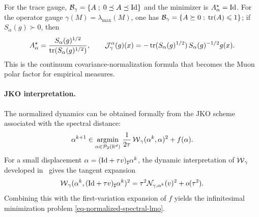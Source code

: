 For the trace gauge, $\mathcal B_\gamma=\left\{ A \;;\; 0\preceq A\preceq\mathrm{Id} \right\}$ and the minimizer is $A_\alpha^\star=\mathrm{Id}$. For the operator gauge $\gamma(M)=\lambda_{\max}(M)$, one has $\mathcal B_\gamma=\left\{ A\succeq0 \;;\; \operatorname{tr}(A)\leqslant1 \right\}$; if $S_\alpha(g)\succ0$, then
\[
	A_\alpha^\star
	=
	\frac{S_\alpha(g)^{1/2}}{\operatorname{tr}(S_\alpha(g)^{1/2})},
	\qquad
	\mathcal J_{\gamma}^{\alpha}(g)(x)
	=
	-\operatorname{tr}(S_\alpha(g)^{1/2})\,S_\alpha(g)^{-1/2}g(x).
\]
This is the continuum covariance-normalization formula that becomes the Muon polar factor for empirical measures.

\paragraph{JKO interpretation.}
The normalized dynamics can be obtained formally from the JKO scheme associated with the spectral distance:
\begin{equation}\label{eq-normalized-spectral-jko}
	\alpha^{k+1}
	\in
	\underset{\alpha\in\mathcal{P}_2(\mathbb{R}^d)}{\operatorname{argmin}}\;
	\frac{1}{2\tau}\operatorname{\mathcal{W}}_\gamma(\alpha^k,\alpha)^2+f(\alpha).
\end{equation}
For a small displacement $\alpha=(\mathrm{Id}+\tau v)_\sharp\alpha^k$, the dynamic interpretation of $\operatorname{\mathcal{W}}_\gamma$ developed in~\cite{peyre2026muon} gives the tangent expansion
\[
	\operatorname{\mathcal{W}}_\gamma(\alpha^k,(\mathrm{Id}+\tau v)_\sharp\alpha^k)^2
	=
	\tau^2\mathcal N_{\gamma,\alpha^k}(v)^2+o(\tau^2).
\]
Combining this with the first-variation expansion of $f$ yields the infinitesimal minimization problem \eqref{eq-normalized-spectral-lmo}.

